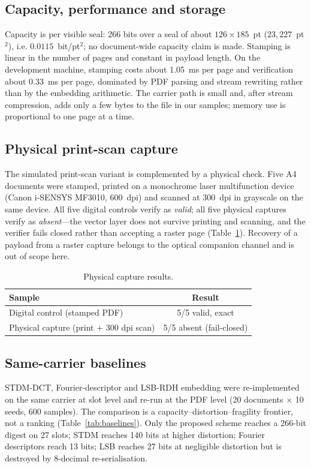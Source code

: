 \documentclass[journal]{IEEEtran}
\begin{document}
\subsection{Capacity, performance and storage}
Capacity is per visible seal: 266 bits over a seal of about $126\times185$~pt ($23{,}227$~pt$^2$),
i.e. $0.0115$~bit/pt$^2$; no document-wide capacity claim is made. Stamping is linear in the number
of pages and constant in payload length. On the development machine, stamping costs about
1.05~ms per page and verification about 0.33~ms per page, dominated by PDF parsing and stream
rewriting rather than by the embedding arithmetic. The carrier path is small and, after stream
compression, adds only a few bytes to the file in our samples; memory use is proportional to one
page at a time.

\subsection{Physical print-scan capture}
The simulated print-scan variant is complemented by a physical check. Five A4 documents were stamped,
printed on a monochrome laser multifunction device (Canon i-SENSYS MF3010, 600~dpi) and scanned at
300~dpi in grayscale on the same device. All five digital controls verify as \emph{valid}; all five
physical captures verify as \emph{absent}---the vector layer does not survive printing and scanning,
and the verifier fails closed rather than accepting a raster page (Table~\ref{tab:physical}).
Recovery of a payload from a raster capture belongs to the optical companion channel and is out of
scope here.

\begin{table}[t]
\centering
\footnotesize
\caption{Physical capture results.}
\label{tab:physical}
\begin{tabular}{@{}lc@{}}
\toprule
Sample & Result \\
\midrule
Digital control (stamped PDF) & 5/5 valid, exact \\
Physical capture (print + 300 dpi scan) & 5/5 absent (fail-closed) \\
\bottomrule
\end{tabular}
\end{table}

\subsection{Same-carrier baselines}
STDM-DCT, Fourier-descriptor and LSB-RDH embedding were re-implemented on the same carrier at slot level and re-run at the PDF level (20 documents $\times$ 10 seeds, 600 samples). The comparison is a capacity--distortion--fragility frontier, not a ranking (Table~\ref{tab:baselines}). Only the proposed scheme reaches a 266-bit digest on 27 slots; STDM reaches 140 bits at higher distortion; Fourier descriptors reach 13 bits; LSB reaches 27 bits at negligible distortion but is destroyed by 8-decimal re-serialisation.
\end{document}
